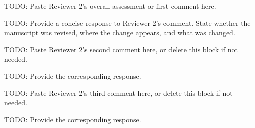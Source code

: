 \reviewer

\begin{revcomment}
TODO: Paste Reviewer 2's overall assessment or first comment here.
\end{revcomment}
\begin{revresponse}
TODO: Provide a concise response to Reviewer 2's comment. State whether the manuscript was revised, where the change appears, and what was changed.
\end{revresponse}

\begin{revcomment}
TODO: Paste Reviewer 2's second comment here, or delete this block if not needed.
\end{revcomment}
\begin{revresponse}
TODO: Provide the corresponding response.
\end{revresponse}

\begin{revcomment}
TODO: Paste Reviewer 2's third comment here, or delete this block if not needed.
\end{revcomment}
\begin{revresponse}
TODO: Provide the corresponding response.
\end{revresponse}
